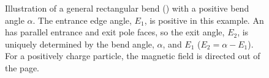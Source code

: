 \begin{figure}[!htb]
\begin{center}
  \end{center}
  \caption{Illustration of a general rectangular bend () with a positive bend angle $\alpha$. The
    entrance edge angle, $E_{1}$, is positive in this example. An  has parallel entrance and exit
    pole faces, so the exit angle, $E_{2}$, is uniquely determined by the bend angle, $\alpha$, and $E_{1}$
    ($E_{2}=\alpha - E_{1}$). For a positively charge particle, the magnetic field is directed out of the page.}
  \label{fig:rbend}
\end{figure}